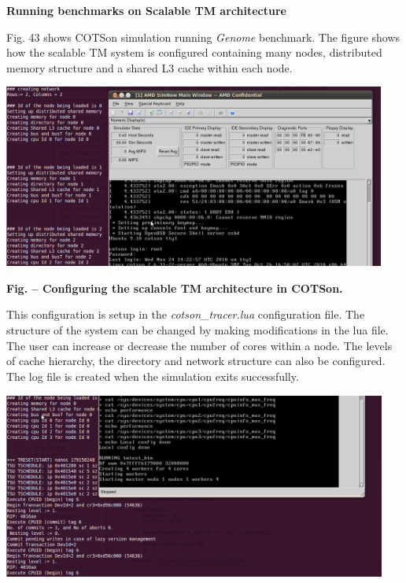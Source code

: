 \documentclass[a4paper]{article}
\newcounter{Figure}
\renewcommand\theFigure{\arabic{Figure}}
\begin{document}
{\bfseries
Running benchmarks on Scalable TM architecture}

{
Fig. 43 shows COTSon simulation running \textit{Genome} benchmark. The
figure shows how the scalable TM system is configured containing many
nodes, distributed memory structure and a shared L3 cache within each
node. }

{\centering 
\includegraphics[width=4.9618in,height=2.3728in]{img59.png}
\par}

{\centering{}\sffamily\bfseries
\label{bkm:Ref388170993}Fig.
\stepcounter{Figure}{\theFigure} -- Configuring the scalable TM
architecture in COTSon.
\par}

{
This configuration is setup in the \textit{cotson\_tracer.lua}
configuration file. The structure of the system can be changed by
making modifications in the lua file. The user can increase or decrease
the number of cores within a node. The levels of cache hierarchy, the
directory and network structure can also be configured. The log file is
created when the simulation exits successfully.}

{\centering 
\includegraphics[width=4.9736in,height=2.4126in]{img60.png}
\par}
\end{document}
